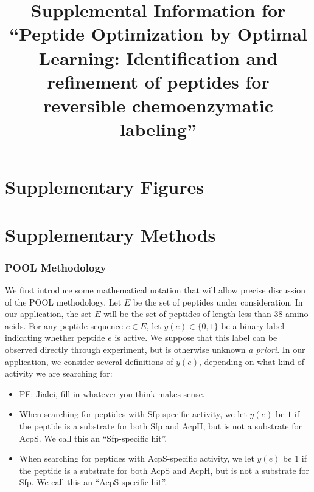 \documentclass[11pt]{article}
\newcommand{\pfcomment}[1]{\color{blue} PF: #1}
\begin{document}
\title{Supplemental Information for \enquote{Peptide Optimization by Optimal Learning: 
Identification and refinement of peptides for reversible chemoenzymatic labeling}}
\maketitle
\tableofcontents
\newpage
\part{Supplementary Figures}
\part{Supplementary Methods}
\section{POOL Methodology}



We first introduce some mathematical notation that will allow precise discussion of the POOL methodology. Let $E$ be the set of peptides under consideration.
In our application, the set $E$ will be the set of peptides of length less than 38 amino acids.
For any peptide sequence $e \in E$, let $y(e) \in \{0, 1\}$ be a binary label indicating whether
peptide $e$ is active.  We suppose that this label can be observed directly through experiment, but is otherwise unknown {\it a priori}.
In our application, we consider several definitions of $y(e)$, depending on what kind of activity we are searching for:
\begin{itemize}
\item \pfcomment{Jialei, fill in whatever you think makes sense}.
\item When searching for peptides with Sfp-specific activity, we let $y(e)$ be $1$ if the peptide is a substrate for both Sfp and AcpH, but is not a substrate for AcpS.  We call this an \enquote{Sfp-specific hit}.
\item When searching for peptides with AcpS-specific activity, we let $y(e)$ be $1$ if the peptide is a substrate for both AcpS and AcpH, but is not a substrate for Sfp.  We call this an \enquote{AcpS-specific hit}.
\end{itemize}
\end{document}
